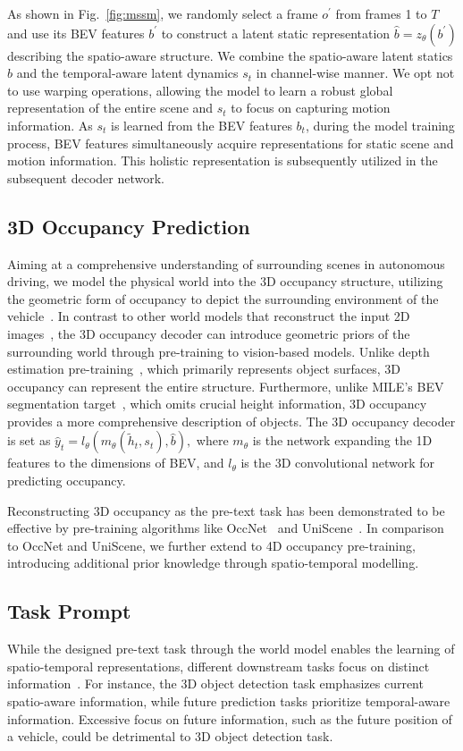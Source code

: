As shown in Fig.~\ref{fig:mssm}, we randomly select a frame $o^{'}$ from frames 1 to $T$ and use its BEV features $b^{'}$ to construct a latent static representation $\hat{b}=z_\theta(b^{'})$ describing the spatio-aware structure. We combine the spatio-aware latent statics $\hat{b}$ and the temporal-aware latent dynamics $s_t$ in channel-wise manner. We opt not to use warping operations, allowing the model to learn a robust global representation of the entire scene and $s_t$ to focus on capturing motion information. As $s_t$ is learned from the BEV features $b_t$, during the model training process, BEV features simultaneously acquire representations for static scene and motion information. This holistic representation is subsequently utilized in the subsequent decoder network.

\subsection{3D Occupancy Prediction}
Aiming at a comprehensive understanding of surrounding scenes in autonomous driving, we model the physical world into the 3D occupancy structure, utilizing the geometric form of occupancy to depict the surrounding environment of the vehicle~\cite{mahjourian2022occupancy,occupancy,liu2023lidar,occnet,khurana2022differentiable}. In contrast to other world models that reconstruct the input 2D images~\cite{dreamerv2,gaia}, the 3D occupancy decoder can introduce geometric priors of the surrounding world through pre-training to vision-based models. Unlike depth estimation pre-training~\cite{dd3d,ppgeo}, which primarily represents object surfaces, 3D occupancy can represent the entire structure. Furthermore, unlike MILE's BEV segmentation target~\cite{mile}, which omits crucial height information, 3D occupancy provides a more comprehensive description of objects. The 3D occupancy decoder is set as $  \hat{y}_{t}= l_\theta(m_\theta(\tilde{  h}_t,   s_{t}), \hat{b}),$
where $m_\theta$ is the network expanding the 1D features to the dimensions of BEV, and $l_\theta$ is the 3D convolutional network for predicting occupancy.

Reconstructing 3D occupancy as the pre-text task has been demonstrated to be effective by pre-training algorithms like OccNet~\cite{occnet} and UniScene~\cite{uniscene}. In comparison to OccNet and UniScene, we further extend to 4D occupancy pre-training, introducing additional prior knowledge through spatio-temporal modelling.

\subsection{Task Prompt}
While the designed pre-text task through the world model enables the learning of spatio-temporal representations, different downstream tasks focus on distinct  information~\cite{wang2023tsp,liang2023visual}. For instance, the 3D object detection task emphasizes current spatio-aware information, while future prediction tasks prioritize temporal-aware information. Excessive focus on future information, such as the future position of a vehicle, could be detrimental to 3D object detection task.

